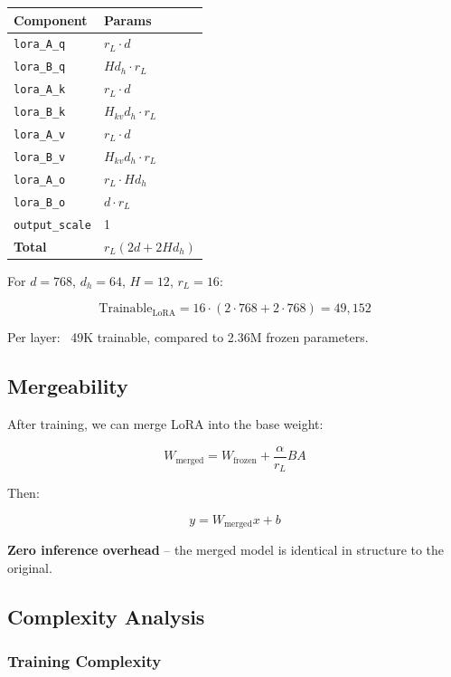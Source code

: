 \begin{table}[H]
\centering
\small
\begin{tabular}{ll}
\toprule
\textbf{Component} & \textbf{Params} \\
\midrule
\texttt{lora\_A\_q} & $r_L \cdot d$ \\
\texttt{lora\_B\_q} & $H d_h \cdot r_L$ \\
\texttt{lora\_A\_k} & $r_L \cdot d$ \\
\texttt{lora\_B\_k} & $H_{kv} d_h \cdot r_L$ \\
\texttt{lora\_A\_v} & $r_L \cdot d$ \\
\texttt{lora\_B\_v} & $H_{kv} d_h \cdot r_L$ \\
\texttt{lora\_A\_o} & $r_L \cdot H d_h$ \\
\texttt{lora\_B\_o} & $d \cdot r_L$ \\
\texttt{output\_scale} & 1 \\
\textbf{Total} & $r_L (2d + 2 H d_h)$ \\
\bottomrule
\end{tabular}
\end{table}

For $d = 768$, $d_h = 64$, $H = 12$, $r_L = 16$:

\[
\text{Trainable}_\text{LoRA} = 16 \cdot (2 \cdot 768 + 2 \cdot 768) = 49,152
\tag{4.2}
\]

Per layer: ~49K trainable, compared to 2.36M frozen parameters.

\subsection{Mergeability}

After training, we can merge LoRA into the base weight:

\[
W_\text{merged} = W_\text{frozen} + \frac{\alpha}{r_L} B A
\tag{4.3}
\]

Then:

\[
y = W_\text{merged} x + b
\tag{4.4}
\]

\textbf{Zero inference overhead} -- the merged model is identical in structure to 
the original.

\subsection{Complexity Analysis}

\subsubsection{Training Complexity}

